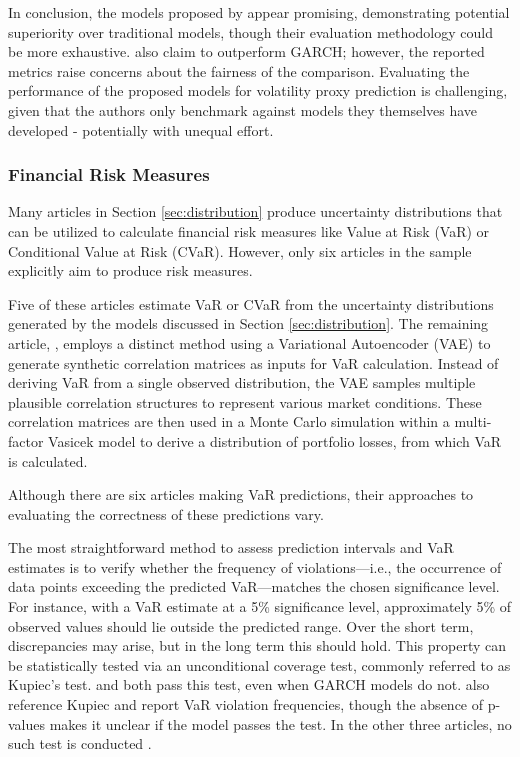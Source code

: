 In conclusion, the models proposed by \textcite{xing2019sentiment,Platanios2014gpr,tegner2021probabilistic} appear promising, demonstrating potential superiority over traditional models, though their evaluation methodology could be more exhaustive. \textcite{Parker2021BayesianHeteroskedastic} also claim to outperform GARCH; however, the reported metrics raise concerns about the fairness of the comparison. Evaluating the performance of the proposed models for volatility proxy prediction is challenging, given that the authors only benchmark against models they themselves have developed - potentially with unequal effort.




\subsubsection{Financial Risk Measures}
\label{sec:financial_risk_measures}

Many articles in Section \ref{sec:distribution} produce uncertainty distributions that can be utilized to calculate financial risk measures like Value at Risk (VaR) or Conditional Value at Risk (CVaR). However, only six articles in the sample explicitly aim to produce risk measures.

Five of these articles estimate VaR or CVaR from the uncertainty distributions generated by the models discussed in Section \ref{sec:distribution}. The remaining article, \textcite{caprioli2023quantifying}, employs a distinct method using a Variational Autoencoder (VAE) to generate synthetic correlation matrices as inputs for VaR calculation. Instead of deriving VaR from a single observed distribution, the VAE samples multiple plausible correlation structures to represent various market conditions. These correlation matrices are then used in a Monte Carlo simulation within a multi-factor Vasicek model to derive a distribution of portfolio losses, from which VaR is calculated.

Although there are six articles making VaR predictions, their approaches to evaluating the correctness of these predictions vary.

The most straightforward method to assess prediction intervals and VaR estimates is to verify whether the frequency of violations—i.e., the occurrence of data points exceeding the predicted VaR—matches the chosen significance level. For instance, with a VaR estimate at a 5\% significance level, approximately 5\% of observed values should lie outside the predicted range. Over the short term, discrepancies may arise, but in the long term this should hold. This property can be statistically tested via an unconditional coverage test, commonly referred to as Kupiec's test. \textcite{Fatouros2023DeepVaR} and \textcite{arian2022encoded} both pass this test, even when GARCH models do not. \textcite{Horenko2020} also reference Kupiec and report VaR violation frequencies, though the absence of p-values makes it unclear if the model passes the test. In the other three articles, no such test is conducted \textcite{Almeida2024RiskForecasting, Risk2018gpr, caprioli2023quantifying}.

